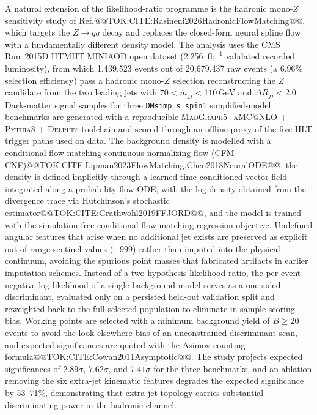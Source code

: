 \documentclass[11pt]{article}
\newcommand{\GeV}{\text{GeV}}
\begin{document}
A natural extension of the likelihood-ratio programme is the hadronic mono-$Z$ sensitivity study of Ref.@@TOK:CITE:Rasineni2026HadronicFlowMatching@@, which targets the $Z\to q\bar{q}$ decay and replaces the closed-form neural spline flow with a fundamentally different density model. The analysis uses the CMS Run~2015D HTMHT MINIAOD open dataset (2.256~$\mathrm{fb}^{-1}$ validated recorded luminosity), from which 1{,}439{,}523 events out of 20{,}679{,}437 raw events (a 6.96\% selection efficiency) pass a hadronic mono-$Z$ selection reconstructing the $Z$ candidate from the two leading jets with $70 < m_{jj} < 110\,\GeV$ and $\Delta R_{jj} < 2.0$. Dark-matter signal samples for three \texttt{DMsimp\_s\_spin1} simplified-model benchmarks are generated with a reproducible \textsc{MadGraph5\_aMC@NLO} + \textsc{Pythia8} + \textsc{Delphes} toolchain and scored through an offline proxy of the five HLT trigger paths used on data. The background density is modelled with a conditional flow-matching continuous normalizing flow (CFM-CNF)@@TOK:CITE:Lipman2023FlowMatching,Chen2018NeuralODE@@: the density is defined implicitly through a learned time-conditioned vector field integrated along a probability-flow ODE, with the log-density obtained from the divergence trace via Hutchinson's stochastic estimator@@TOK:CITE:Grathwohl2019FFJORD@@, and the model is trained with the simulation-free conditional flow-matching regression objective. Undefined angular features that arise when no additional jet exists are preserved as explicit out-of-range sentinel values ($-999$) rather than imputed into the physical continuum, avoiding the spurious point masses that fabricated artifacts in earlier imputation schemes. Instead of a two-hypothesis likelihood ratio, the per-event negative log-likelihood of a single background model serves as a one-sided discriminant, evaluated only on a persisted held-out validation split and reweighted back to the full selected population to eliminate in-sample scoring bias. Working points are selected with a minimum background yield of $B\geq 20$ events to avoid the look-elsewhere bias of an unconstrained discriminant scan, and expected significances are quoted with the Asimov counting formula@@TOK:CITE:Cowan2011Asymptotic@@. The study projects expected significances of $2.89\sigma$, $7.62\sigma$, and $7.41\sigma$ for the three benchmarks, and an ablation removing the six extra-jet kinematic features degrades the expected significance by 53--71\%, demonstrating that extra-jet topology carries substantial discriminating power in the hadronic channel.
\end{document}
